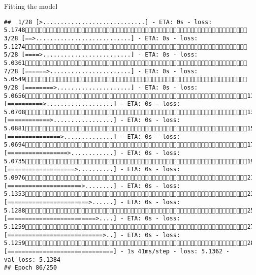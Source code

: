 \documentclass[
  ignorenonframetext,
]{beamer}
\begin{document}
\begin{frame}[fragile]{Fitting the model}
\begin{verbatim}
##  1/28 [>.............................] - ETA: 0s - loss: 5.1748 3/28 [==>...........................] - ETA: 0s - loss: 5.1274 5/28 [====>.........................] - ETA: 0s - loss: 5.0361 7/28 [======>.......................] - ETA: 0s - loss: 5.0549 9/28 [========>.....................] - ETA: 0s - loss: 5.065611/28 [==========>...................] - ETA: 0s - loss: 5.070813/28 [============>.................] - ETA: 0s - loss: 5.088115/28 [===============>..............] - ETA: 0s - loss: 5.069417/28 [=================>............] - ETA: 0s - loss: 5.073519/28 [===================>..........] - ETA: 0s - loss: 5.097621/28 [=====================>........] - ETA: 0s - loss: 5.135323/28 [=======================>......] - ETA: 0s - loss: 5.128825/28 [=========================>....] - ETA: 0s - loss: 5.125927/28 [===========================>..] - ETA: 0s - loss: 5.125928/28 [==============================] - 1s 41ms/step - loss: 5.1362 - val_loss: 5.1384
## Epoch 86/250

\end{verbatim}
\end{frame}
\end{document}
